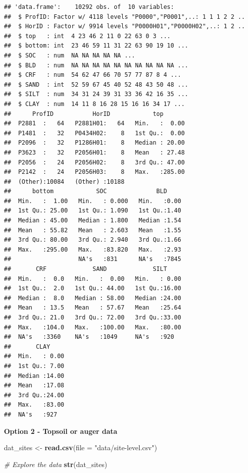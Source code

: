 \documentclass[10pt,b5paper,]{book}
\newenvironment{Shaded}{\begin{snugshade}}{\end{snugshade}}
\newcommand{\CommentTok}[1]{\textcolor[rgb]{0.56,0.35,0.01}{\textit{#1}}}
\newcommand{\DataTypeTok}[1]{\textcolor[rgb]{0.13,0.29,0.53}{#1}}
\newcommand{\KeywordTok}[1]{\textcolor[rgb]{0.13,0.29,0.53}{\textbf{#1}}}
\newcommand{\NormalTok}[1]{#1}
\newcommand{\StringTok}[1]{\textcolor[rgb]{0.31,0.60,0.02}{#1}}
\theoremstyle{definition}
\theoremstyle{definition}
\theoremstyle{definition}
\theoremstyle{remark}
\begin{document}
\begin{verbatim}
## 'data.frame':    10292 obs. of  10 variables:
##  $ ProfID: Factor w/ 4118 levels "P0000","P0001",..: 1 1 1 2 2 ..
##  $ HorID : Factor w/ 9914 levels "P0000H01","P0000H02",..: 1 2 ..
##  $ top   : int  4 23 46 2 11 0 22 63 0 3 ...
##  $ bottom: int  23 46 59 11 31 22 63 90 19 10 ...
##  $ SOC   : num  NA NA NA NA NA ...
##  $ BLD   : num  NA NA NA NA NA NA NA NA NA NA ...
##  $ CRF   : num  54 62 47 66 70 57 77 87 8 4 ...
##  $ SAND  : int  52 59 67 45 40 52 48 43 50 48 ...
##  $ SILT  : num  34 31 24 39 31 33 36 42 16 35 ...
##  $ CLAY  : num  14 11 8 16 28 15 16 16 34 17 ...
##      ProfID           HorID            top        
##  P2881  :   64   P2881H01:   64   Min.   :  0.00  
##  P1481  :   32   P0434H02:    8   1st Qu.:  0.00  
##  P2096  :   32   P1286H01:    8   Median : 20.00  
##  P3623  :   32   P2056H01:    8   Mean   : 27.48  
##  P2056  :   24   P2056H02:    8   3rd Qu.: 47.00  
##  P2142  :   24   P2056H03:    8   Max.   :285.00  
##  (Other):10084   (Other) :10188                   
##      bottom            SOC              BLD      
##  Min.   :  1.00   Min.   : 0.000   Min.   :0.00  
##  1st Qu.: 25.00   1st Qu.: 1.090   1st Qu.:1.40  
##  Median : 45.00   Median : 1.800   Median :1.54  
##  Mean   : 55.82   Mean   : 2.603   Mean   :1.55  
##  3rd Qu.: 80.00   3rd Qu.: 2.940   3rd Qu.:1.66  
##  Max.   :295.00   Max.   :83.820   Max.   :2.93  
##                   NA's   :831      NA's   :7845  
##       CRF             SAND             SILT      
##  Min.   :  0.0   Min.   :  0.00   Min.   : 0.00  
##  1st Qu.:  2.0   1st Qu.: 44.00   1st Qu.:16.00  
##  Median :  8.0   Median : 58.00   Median :24.00  
##  Mean   : 13.5   Mean   : 57.67   Mean   :25.64  
##  3rd Qu.: 21.0   3rd Qu.: 72.00   3rd Qu.:33.00  
##  Max.   :104.0   Max.   :100.00   Max.   :80.00  
##  NA's   :3360    NA's   :1049     NA's   :920    
##       CLAY      
##  Min.   : 0.00  
##  1st Qu.: 7.00  
##  Median :14.00  
##  Mean   :17.08  
##  3rd Qu.:24.00  
##  Max.   :83.00  
##  NA's   :927
\end{verbatim}

\textbf{Option 2 - Topsoil or auger data}

\begin{Shaded}
\begin{Highlighting}[]
\NormalTok{dat_sites <-}\StringTok{ }\KeywordTok{read.csv}\NormalTok{(}\DataTypeTok{file =} \StringTok{"data/site-level.csv"}\NormalTok{)}

\CommentTok{# Explore the data}
\KeywordTok{str}\NormalTok{(dat_sites)}
\end{Highlighting}
\end{Shaded}
\end{document}
